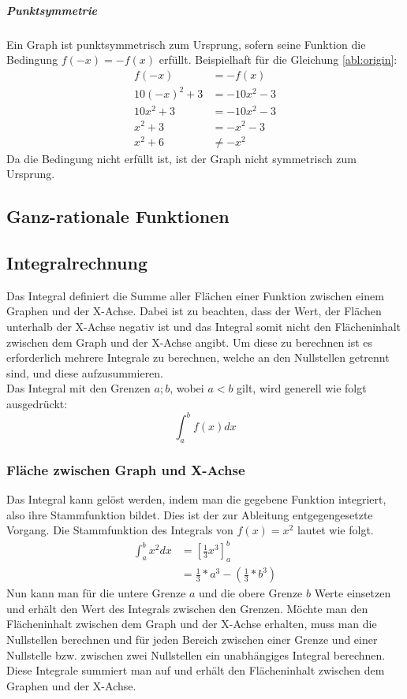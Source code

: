 \documentclass[a4paper]{article}
\begin{document}
				\subparagraph{Punktsymmetrie}
					Ein Graph ist punktsymmetrisch zum Ursprung, sofern seine Funktion die Bedingung $f(-x) = -f(x)$ erfüllt. Beispielhaft für die Gleichung \ref{abl:origin}:
					\begin{equation}
						\begin{split}
							f(-x) &= -f(x)\\
							10(-x)^2+3 &= -10x^2-3\\
							10x^2+3 &= -10x^2-3\\
							x^2+3 &= -x^2-3\\
							x^2+6 &\neq -x^2
						\end{split}
					\end{equation}
					Da die Bedingung nicht erfüllt ist, ist der Graph nicht symmetrisch zum Ursprung.
		\subsection{Ganz-rationale Funktionen}
		\subsection{Integralrechnung}
			Das Integral definiert die Summe aller Flächen einer Funktion zwischen einem Graphen und der X-Achse. Dabei ist zu beachten, dass der Wert, der Flächen unterhalb der X-Achse negativ ist und das Integral somit nicht den Flächeninhalt zwischen dem Graph und der X-Achse angibt. Um diese zu berechnen ist es erforderlich mehrere Integrale zu berechnen, welche an den Nullstellen getrennt sind, und diese aufzusummieren.\\
			Das Integral mit den Grenzen $a; b$, wobei $a < b$ gilt, wird generell wie folgt ausgedrückt:
			\begin{equation}
				\int_{a}^{b}f(x)dx\label{integral}
			\end{equation}
			\subsubsection{Fläche zwischen Graph und X-Achse}
				Das Integral kann gelöst werden, indem man die gegebene Funktion integriert, also ihre Stammfunktion bildet. Dies ist der zur Ableitung entgegengesetzte Vorgang. Die Stammfunktion des Integrals von $f(x) = x^2$ lautet wie folgt.
				\begin{equation}
					\begin{split}
						\int_{a}^{b}x^2dx &= \left[\frac{1}{3}x^3\right]_a^b \\
										  &= \frac{1}{3} * a^3 - (\frac{1}{3} * b^3)
					\end{split}
				\end{equation}
				Nun kann man für die untere Grenze $a$ und die obere Grenze $b$ Werte einsetzen und erhält den Wert des Integrals zwischen den Grenzen. Möchte man den Flächeninhalt zwischen dem Graph und der X-Achse erhalten, muss man die Nullstellen berechnen und für jeden Bereich zwischen einer Grenze und einer Nullstelle bzw. zwischen zwei Nullstellen ein unabhängiges Integral berechnen. Diese Integrale summiert man auf und erhält den Flächeninhalt zwischen dem Graphen und der X-Achse.
\end{document}
